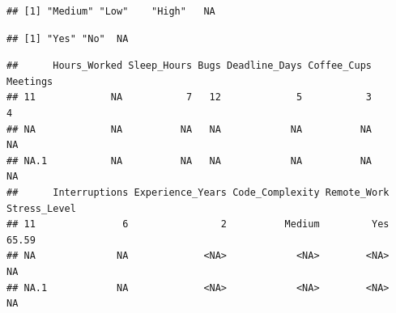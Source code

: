 \documentclass[
]{article}
\newenvironment{Shaded}{\begin{snugshade}}{\end{snugshade}}
\newcommand{\ConstantTok}[1]{\textcolor[rgb]{0.56,0.35,0.01}{#1}}
\newcommand{\FunctionTok}[1]{\textcolor[rgb]{0.13,0.29,0.53}{\textbf{#1}}}
\newcommand{\NormalTok}[1]{#1}
\newcommand{\OtherTok}[1]{\textcolor[rgb]{0.56,0.35,0.01}{#1}}
\newcommand{\SpecialCharTok}[1]{\textcolor[rgb]{0.81,0.36,0.00}{\textbf{#1}}}
\newcommand{\StringTok}[1]{\textcolor[rgb]{0.31,0.60,0.02}{#1}}
\begin{document}
\begin{verbatim}
## [1] "Medium" "Low"    "High"   NA
\end{verbatim}

\begin{Shaded}
\end{Shaded}

\begin{verbatim}
## [1] "Yes" "No"  NA
\end{verbatim}

\begin{Shaded}
\end{Shaded}

\begin{verbatim}
##      Hours_Worked Sleep_Hours Bugs Deadline_Days Coffee_Cups Meetings
## 11             NA           7   12             5           3        4
## NA             NA          NA   NA            NA          NA       NA
## NA.1           NA          NA   NA            NA          NA       NA
##      Interruptions Experience_Years Code_Complexity Remote_Work Stress_Level
## 11               6                2          Medium         Yes        65.59
## NA              NA             <NA>            <NA>        <NA>           NA
## NA.1            NA             <NA>            <NA>        <NA>           NA
\end{verbatim}

\begin{Shaded}
\end{Shaded}

\begin{Shaded}
\end{Shaded}
\end{document}

